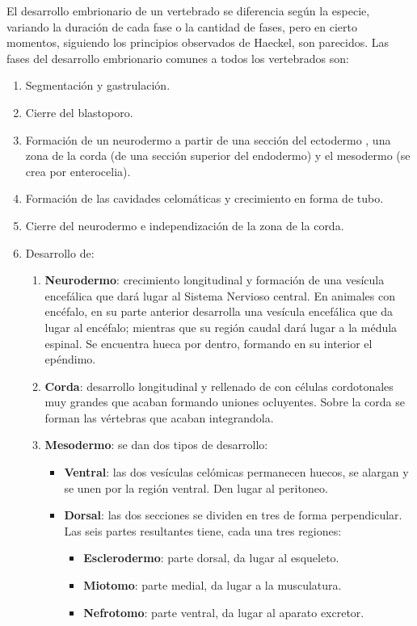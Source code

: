 El desarrollo embrionario de un vertebrado se diferencia según la especie, variando la duración de cada fase o la cantidad de fases, pero en cierto momentos, siguiendo los principios observados de Haeckel, son parecidos. Las fases del desarrollo embrionario comunes a todos los vertebrados son:
\begin{enumerate}[itemsep=0pt,parsep=0pt,topsep=0pt,partopsep=0pt]
    \item Segmentación y gastrulación.
    \item Cierre del blastoporo.
    \item Formación de un neurodermo a partir de una sección del ectodermo , una zona de la corda (de una sección superior del endodermo) y el mesodermo (se crea por enterocelia).
    \item Formación de las cavidades celomáticas y crecimiento en forma de tubo.
    \item Cierre del neurodermo e independización de la zona de la corda.
    \item Desarrollo de:
    \begin{enumerate}[itemsep=0pt,parsep=0pt,topsep=0pt,partopsep=0pt]
        \item \textbf{Neurodermo}: crecimiento longitudinal y formación de una vesícula encefálica que dará lugar al Sistema Nervioso central. En animales con encéfalo, en su parte anterior desarrolla una vesícula encefálica que da lugar al encéfalo; mientras que su región caudal dará lugar a la médula espinal. Se encuentra hueca por dentro, formando en su interior el epéndimo.
        \item\textbf{Corda}: desarrollo longitudinal y rellenado de con células cordotonales muy grandes que acaban formando uniones ocluyentes. Sobre la corda se forman las vértebras que acaban integrandola.
        \item\textbf{Mesodermo}: se dan dos tipos de desarrollo:
        \begin{itemize}[itemsep=0pt,parsep=0pt,topsep=0pt,partopsep=0pt]
            \item \textbf{Ventral}: las dos vesículas celómicas permanecen huecos, se alargan y se unen por la región ventral. Den lugar al peritoneo.
            \item\textbf{Dorsal}: las dos secciones se dividen en tres de forma perpendicular. Las seis partes resultantes tiene, cada una tres regiones:
            \begin{itemize}[itemsep=0pt,parsep=0pt,topsep=0pt,partopsep=0pt]
                \item \textbf{Esclerodermo}: parte dorsal, da lugar al esqueleto.
                \item\textbf{Miotomo}: parte medial, da lugar a la musculatura.
                \item\textbf{Nefrotomo}: parte ventral, da lugar al aparato excretor.
            \end{itemize}
        \end{itemize}
     \end{enumerate}
\end{enumerate}

